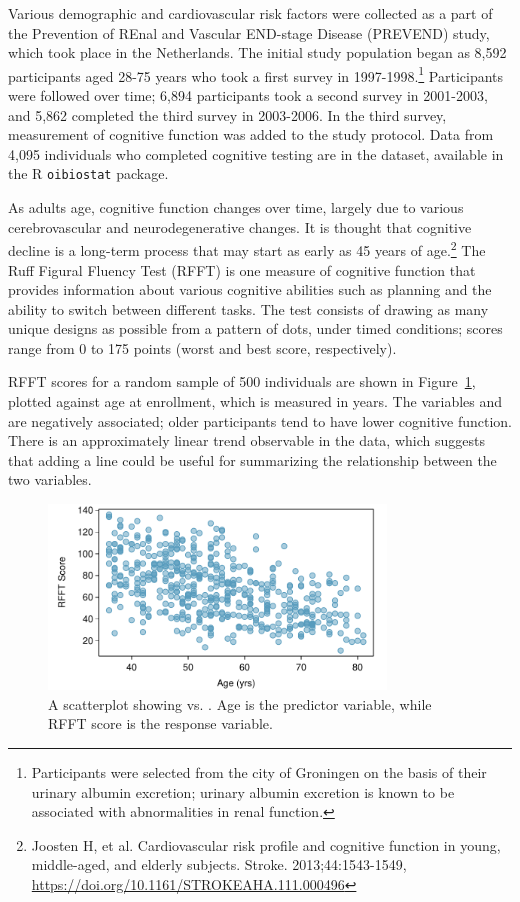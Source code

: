 Various demographic and cardiovascular risk factors were collected as a part of the Prevention of REnal and Vascular END-stage Disease (PREVEND) study, which took place in the Netherlands. The initial study population began as 8,592 participants aged 28-75 years who took a first survey in 1997-1998.\footnote{Participants were selected from the city of Groningen on the basis of their urinary albumin excretion; urinary albumin excretion is known to be associated with abnormalities in renal function.} Participants were followed over time; 6,894 participants took a second survey in 2001-2003, and 5,862 completed the third survey in 2003-2006. In the third survey, measurement of cognitive function was added to the study protocol. Data from 4,095 individuals who completed cognitive testing are in the  dataset, available in the \textsf{R} \texttt{oibiostat} package. 

As adults age, cognitive function changes over time, largely due to various cerebrovascular and neurodegenerative changes. It is thought that cognitive decline is a long-term process that may start as early as 45 years of age.\footnote{Joosten H, et al. Cardiovascular risk profile and cognitive function in young, middle-aged, and elderly subjects. Stroke. 2013;44:1543-1549, \url{https://doi.org/10.1161/STROKEAHA.111.000496} } The Ruff Figural Fluency Test (RFFT) is one measure of cognitive function that provides information about various cognitive abilities such as planning and the ability to switch between different tasks. The test consists of drawing as many unique designs as possible from a pattern of dots, under timed conditions; scores range from 0 to 175 points (worst and best score, respectively).

RFFT scores for a random sample of 500 individuals are shown in Figure~\ref{prevendAgeRFFT}, plotted against age at enrollment, which is measured in years. The variables  and  are negatively associated; older participants tend to have lower cognitive function. There is an approximately linear trend observable in the data, which suggests that adding a line could be useful for summarizing the relationship between the two variables.

\begin{figure}[h!]
	\centering
	\includegraphics[width=0.8\textwidth]
	{ch_simple_linear_regression_oi_biostat/figures/prevendAgeRFFTPlot/prevendAgeRFFTPlot}
	\caption{A scatterplot showing  vs. . Age is the predictor variable, while RFFT score is the response variable.}
	\label{prevendAgeRFFT}
\end{figure}

